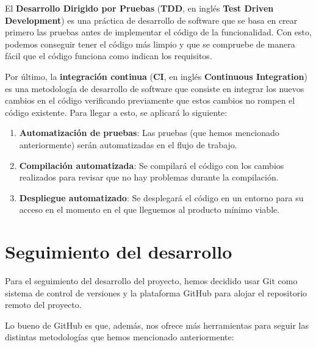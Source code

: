 El \textbf{Desarrollo Dirigido por Pruebas} (\textbf{TDD}, en inglés \textbf{Test 
Driven Development}) \cite{tdd} es una práctica de desarrollo de software que se 
basa en crear primero las pruebas antes de implementar el código de la 
funcionalidad. Con esto, podemos conseguir tener el código más limpio y que se 
compruebe de manera fácil que el código funciona como indican los requisitos.

Por último, la \textbf{integración continua} (\textbf{CI}, en inglés 
\textbf{Continuous Integration}) \cite{ci} es una metodología de desarrollo de 
software que consiste en integrar los nuevos cambios en el código verificando 
previamente que estos cambios no rompen el código existente. Para llegar a esto, se 
aplicará lo siguiente:

\begin{enumerate}
    \item \textbf{Automatización de pruebas}: Las pruebas (que hemos mencionado 
    anteriormente) serán automatizadas en el flujo de trabajo.
    \item \textbf{Compilación automatizada}: Se compilará el código con los cambios 
    realizados para revisar que no hay problemas durante la compilación.
    \item \textbf{Despliegue automatizado}: Se desplegará el código en un entorno 
    para su acceso en el momento en el que lleguemos al producto mínimo viable.
\end{enumerate}

\section{Seguimiento del desarrollo}

Para el seguimiento del desarrollo del proyecto, hemos decidido usar Git como 
sistema de control de versiones y la plataforma GitHub para alojar el repositorio 
remoto del proyecto.

Lo bueno de GitHub es que, además, nos ofrece más herramientas para seguir las 
distintas metodologías que hemos mencionado anteriormente:

